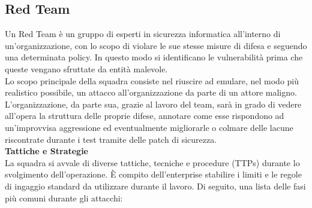     \subsection{Red Team\label{red}}
    Un Red Team è un gruppo di esperti in sicurezza informatica all'interno di un'organizzazione, con lo scopo di violare le sue stesse misure di difesa e seguendo una determinata policy. In questo modo si identificano le vulnerabilità prima che queste vengano sfruttate da entità malevole.\\
    Lo scopo principale della squadra consiste nel riuscire ad emulare, nel modo più realistico possibile, un attacco all'organizzazione da parte di un attore maligno. L'organizzazione, da parte sua, grazie al lavoro del team, sarà in grado di vedere all'opera la struttura delle proprie difese, annotare come esse rispondono ad un'improvvisa aggressione ed eventualmente migliorarle o colmare delle lacune riscontrate durante i test tramite delle patch di sicurezza.\\[1.5em]
    {\bfseries\Large Tattiche e Strategie}\\[1.5em]
    La squadra si avvale di diverse tattiche, tecniche e procedure (TTPs) durante lo svolgimento dell'operazione. È compito dell'enterprise stabilire i limiti e le regole di ingaggio standard da utilizzare durante il lavoro. Di seguito, una lista delle fasi più comuni durante gli attacchi:
